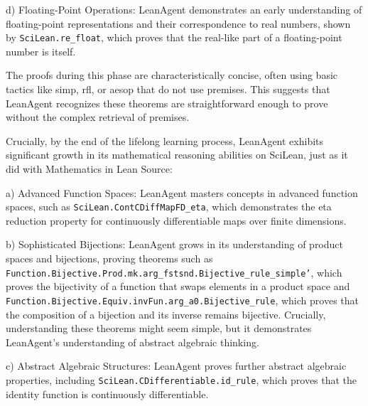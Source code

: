 \documentclass{article} %
\begin{document}
d) Floating-Point Operations:
LeanAgent demonstrates an early understanding of floating-point representations and their correspondence to real numbers, shown by \texttt{SciLean.re\_float}, which proves that the real-like part of a floating-point number is itself.



The proofs during this phase are characteristically concise, often using basic tactics like simp, rfl, or aesop that do not use premises. This suggests that LeanAgent recognizes these theorems are straightforward enough to prove without the complex retrieval of premises.

Crucially, by the end of the lifelong learning process, LeanAgent exhibits significant growth in its mathematical reasoning abilities on SciLean, just as it did with Mathematics in Lean Source:

a) Advanced Function Spaces:
LeanAgent masters concepts in advanced function spaces, such as \texttt{SciLean.ContCDiffMapFD\_eta}, which demonstrates the eta reduction property for continuously differentiable maps over finite dimensions.

b) Sophisticated Bijections:
LeanAgent grows in its understanding of product spaces and bijections, proving theorems such as \texttt{Function.Bijective.Prod.mk.arg\_fstsnd.Bijective\_rule\_simple'}, which proves the bijectivity of a function that swaps elements in a product space and \texttt{Function.Bijective.Equiv.invFun.arg\_a0.Bijective\_rule}, which proves that the composition of a bijection and its inverse remains bijective. Crucially, understanding these theorems might seem simple, but it demonstrates LeanAgent's understanding of abstract algebraic thinking.

c) Abstract Algebraic Structures:
LeanAgent proves further abstract algebraic properties, including \texttt{SciLean.CDifferentiable.id\_rule}, which proves that the identity function is continuously differentiable.
\end{document}

